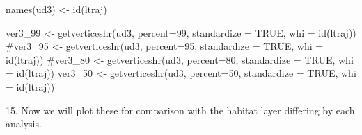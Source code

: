 \documentclass[
  letterpaper,
]{book}
\newenvironment{Shaded}{\begin{snugshade}}{\end{snugshade}}
\newcommand{\AttributeTok}[1]{\textcolor[rgb]{0.40,0.45,0.13}{#1}}
\newcommand{\CommentTok}[1]{\textcolor[rgb]{0.37,0.37,0.37}{#1}}
\newcommand{\ConstantTok}[1]{\textcolor[rgb]{0.56,0.35,0.01}{#1}}
\newcommand{\DecValTok}[1]{\textcolor[rgb]{0.68,0.00,0.00}{#1}}
\newcommand{\FunctionTok}[1]{\textcolor[rgb]{0.28,0.35,0.67}{#1}}
\newcommand{\NormalTok}[1]{\textcolor[rgb]{0.00,0.23,0.31}{#1}}
\newcommand{\OtherTok}[1]{\textcolor[rgb]{0.00,0.23,0.31}{#1}}
\begin{document}
\begin{Shaded}
\begin{Highlighting}[]
\FunctionTok{names}\NormalTok{(ud3) }\OtherTok{\textless{}{-}} \FunctionTok{id}\NormalTok{(ltraj) }

\NormalTok{ver3\_99 }\OtherTok{\textless{}{-}} \FunctionTok{getverticeshr}\NormalTok{(ud3, }\AttributeTok{percent=}\DecValTok{99}\NormalTok{, }\AttributeTok{standardize =} \ConstantTok{TRUE}\NormalTok{, }\AttributeTok{whi =} \FunctionTok{id}\NormalTok{(ltraj))}
\CommentTok{\#ver3\_95 \textless{}{-} getverticeshr(ud3, percent=95, standardize = TRUE, whi = id(ltraj))}
\CommentTok{\#ver3\_80 \textless{}{-} getverticeshr(ud3, percent=80, standardize = TRUE, whi = id(ltraj))}
\NormalTok{ver3\_50 }\OtherTok{\textless{}{-}} \FunctionTok{getverticeshr}\NormalTok{(ud3, }\AttributeTok{percent=}\DecValTok{50}\NormalTok{, }\AttributeTok{standardize =} \ConstantTok{TRUE}\NormalTok{, }\AttributeTok{whi =} \FunctionTok{id}\NormalTok{(ltraj))}
\end{Highlighting}
\end{Shaded}

15. Now we will plot these for comparison with the habitat layer
differing by each analysis.
\end{document}
